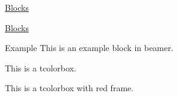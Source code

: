 \documentclass[11pt,aspectratio=43,xcolor={dvipsnames},hyperref={pdftex,pdfpagemode=UseNone,hidelinks,pdfdisplaydoctitle=true},usepdftitle=false]{ctexbeamer}
\begin{document}
\begin{frame}{\underline{Blocks}}
  \itshape\lipsum[3]
\end{frame}

\begin{frame}{\underline{Blocks}}
  \begin{exampleblock}{Example}
    This is an example block in beamer.
  \end{exampleblock}

  \begin{tcolorbox}
    This is a tcolorbox.
  \end{tcolorbox}

  \begin{tcolorbox}[colframe=purple!70,colback=red!10]
    This is a tcolorbox with red frame.
  \end{tcolorbox}
\end{frame}

\begin{frame}
  \begin{center}
    \Huge{}
  \end{center}
\end{frame}
\end{document}
